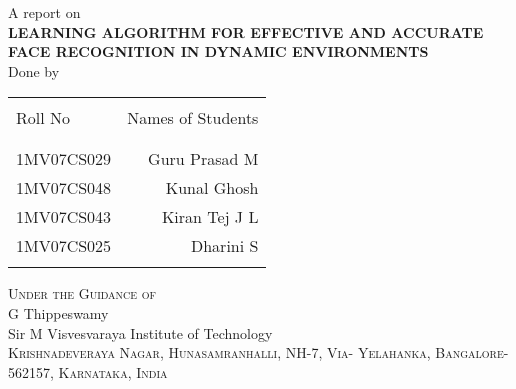 \begin{titlepage}

\begin{center}

\textup{\large A report on}\\[1.0cm]

\uppercase{\Large \textbf {Learning Algorithm for Effective and Accurate Face Recognition in Dynamic Environments}}\\[3.0cm]

\normalsize Done by \\
\begin{table}[h]
\centering
\begin{tabular}{lr}\hline \\
Roll No & Names of Students \\ \\ \hline
\\
1MV07CS029 & Guru Prasad M \\
1MV07CS048 & Kunal Ghosh \\
1MV07CS043 & Kiran Tej J L \\
1MV07CS025 & Dharini S \\ \\ \hline 
\end{tabular}
\end{table}

\vfill

\normalsize
\textsc{Under the Guidance of }\\
G Thippeswamy\\
\LARGE{Sir M Visvesvaraya Institute of Technology }\\
\normalsize
\textsc{Krishnadeveraya Nagar, Hunasamranhalli, NH-7, Via- Yelahanka, Bangalore-562157, Karnataka, India}\\

\vspace{0.5cm}


\end{center}

\end{titlepage}
